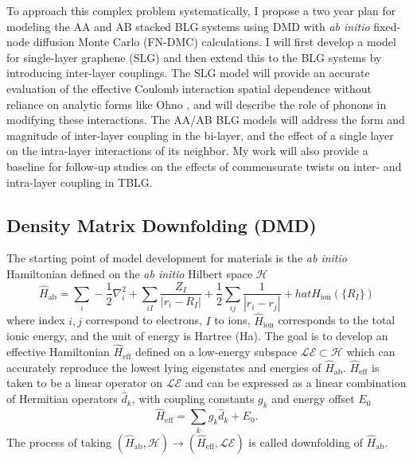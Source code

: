 \documentclass[12pt]{article}
\begin{document}
To approach this complex problem systematically, I propose a two year plan for modeling the AA and AB stacked BLG systems using DMD with \textit{ab initio} fixed-node diffusion Monte Carlo (FN-DMC) calculations.
I will first develop a model for single-layer graphene (SLG) and then extend this to the BLG systems by introducing inter-layer couplings.
The SLG model will provide an accurate evaluation of the effective Coulomb interaction spatial dependence without reliance on analytic forms like Ohno \cite{Ohno1964}, and will describe the role of phonons in modifying these interactions. 
The AA/AB BLG models will address the form and magnitude of inter-layer coupling in the bi-layer, and the effect of a single layer on the intra-layer interactions of its neighbor.
My work will also provide a baseline for follow-up studies on the effects of commensurate twists on inter- and intra-layer coupling in TBLG.

\subsection{Density Matrix Downfolding (DMD)}
The starting point of model development for materials is the \textit{ab initio} Hamiltonian defined on the \textit{ab initio} Hilbert space $\mathcal{H}$
\begin{equation}
\hat{H}_\text{ab} = \sum_i -\frac{1}{2} \nabla_i^2 + \sum_{iI}\frac{Z_I}{|r_i - R_I|} + \frac{1}{2} \sum_{ij} \frac{1}{|r_i - r_j|} + hat{H}_\text{ion}(\{R_I\})  
\label{eq:Hab}
\end{equation}
where index $i,j$ correspond to electrons, $I$ to ions, $\hat{H}_\text{ion}$ corresponds to the total ionic energy, and the unit of energy is Hartree (Ha).
The goal is to develop an effective Hamiltonian $\hat{H}_\text{eff}$ defined on a low-energy subspace $\mathcal{LE} \subset \mathcal{H}$ which can accurately reproduce the lowest lying eigenstates and energies of $\hat{H}_\text{ab}$.
$\hat{H}_\text{eff}$ is taken to be a linear operator on $\mathcal{LE}$ and can be expressed as a linear combination of Hermitian operators $\hat{d}_k$, with coupling constants $g_k$ and energy offset $E_0$
\begin{equation}
\hat{H}_\text{eff} = \sum_{k} g_k \hat{d}_k  + E_0.
\label{eq:Heff}
\end{equation}
The process of taking $(\hat{H}_\text{ab}, \mathcal{H}) \rightarrow (\hat{H}_\text{eff}, \mathcal{LE})$ is called downfolding of $\hat{H}_\text{ab}$.
\end{document}
